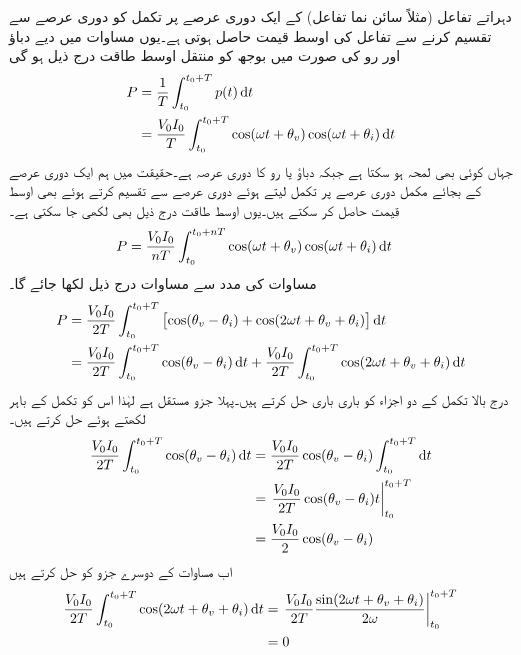 دہراتے تفاعل (مثلاً سائن نما تفاعل) کے ایک دوری عرصے پر تکمل کو دوری عرصے سے تقسیم کرنے سے تفاعل کی اوسط قیمت حاصل ہوتی ہے۔یوں مساوات  میں دیے دباؤ اور رو کی صورت میں بوجھ کو منتقل اوسط طاقت درج ذیل ہو گی
\begin{gather}
\begin{aligned}\label{مساوات_طاقت_اوسط_تکمل_الف}
P&=\frac{1}{T}\int_{t_0}^{t_0+T} p(t) \dif t\\
&=\frac{V_0 I_0}{T}\int_{t_0}^{t_0+T} \cos(\omega t +\theta_v) \cos(\omega t +\theta_i) \dif t
\end{aligned}
\end{gather}    
جہاں  کوئی بھی لمحہ ہو سکتا ہے جبکہ  دباؤ یا رو کا دوری عرصہ ہے۔حقیقت میں ہم ایک دوری عرصے کے بجائے   مکمل دوری عرصے پر تکمل لیتے ہوئے  دوری عرصے سے تقسیم کرتے ہوئے بھی اوسط قیمت حاصل کر سکتے ہیں۔یوں اوسط طاقت درج ذیل بھی لکھی جا سکتی ہے۔
\begin{align}
P&=\frac{V_0 I_0}{nT}\int_{t_0}^{t_0+nT} \cos(\omega t +\theta_v) \cos(\omega t +\theta_i) \dif t
\end{align} 
مساوات  کی مدد سے مساوات  درج ذیل لکھا جائے گا۔
\begin{gather}
\begin{aligned}\label{مساوات_طاقت_اوسط_تکمل_ب}
P&=\frac{V_0 I_0}{2T}\int_{t_0}^{t_0+T} \left[\cos(\theta_v-\theta_i)+\cos(2\omega t +\theta_v+\theta_i)\right] \dif t\\
&=\frac{V_0 I_0}{2T}\int_{t_0}^{t_0+T} \cos(\theta_v-\theta_i) \dif t+\frac{V_0 I_0}{2T}\int_{t_0}^{t_0+T} \cos(2\omega t +\theta_v+\theta_i)\dif t
\end{aligned}
\end{gather} 
درج بالا تکمل کے دو اجزاء کو باری باری حل کرتے ہیں۔پہلا جزو مستقل ہے لہٰذا اس کو تکمل کے باہر لکھتے ہوئے حل کرتے ہیں۔
\begin{align*}
\frac{V_0 I_0}{2T}\int_{t_0}^{t_0+T} \cos(\theta_v-\theta_i) \dif t&=\frac{V_0 I_0}{2T}\cos(\theta_v-\theta_i) \int_{t_0}^{t_0+T} \dif t\\
&=\left. \frac{V_0 I_0}{2T}\cos(\theta_v-\theta_i) t\right|_{t_0}^{t_0+T}\\
&=\frac{V_0 I_0}{2}\cos(\theta_v-\theta_i)
\end{align*}
اب مساوات  کے دوسرے جزو کو حل کرتے ہیں
\begin{align*}
\frac{V_0 I_0}{2T}\int_{t_0}^{t_0+T} \cos(2\omega t +\theta_v+\theta_i)\dif t&=\left. \frac{V_0 I_0}{2T}\frac{ \sin(2\omega t +\theta_v+\theta_i)}{2\omega}\right|_{t_0}^{t_0+T}\\
&=0
\end{align*}

